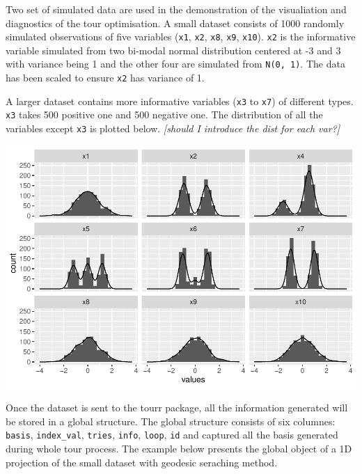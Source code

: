 \documentclass[12pt]{article}
\newenvironment{Shaded}{\begin{snugshade}}{\end{snugshade}}
\newcommand{\DecValTok}[1]{\textcolor[rgb]{0.00,0.00,0.81}{#1}}
\newcommand{\KeywordTok}[1]{\textcolor[rgb]{0.13,0.29,0.53}{\textbf{#1}}}
\newcommand{\NormalTok}[1]{#1}
\newcommand{\OperatorTok}[1]{\textcolor[rgb]{0.81,0.36,0.00}{\textbf{#1}}}
\newcommand{\StringTok}[1]{\textcolor[rgb]{0.31,0.60,0.02}{#1}}
\begin{document}
Two set of simulated data are used in the demonstration of the
visualiation and diagnostics of the tour optimisation. A small dataset
consists of 1000 randomly simulated observations of five variables
(\texttt{x1}, \texttt{x2}, \texttt{x8}, \texttt{x9}, \texttt{x10}).
\texttt{x2} is the informative variable simulated from two bi-modal
normal distribution centered at -3 and 3 with variance being 1 and the
other four are simulated from \texttt{N(0,\ 1)}. The data has been
scaled to ensure \texttt{x2} has variance of 1.

A larger dataset contains more informative variables (\texttt{x3} to
\texttt{x7}) of different types. \texttt{x3} takes 500 positive one and
500 negative one. The distribution of all the variables except
\texttt{x3} is plotted below. \emph{{[}should I introduce the dist for
each var?{]}}

\includegraphics{paper_files/figure-latex/unnamed-chunk-3-1.pdf}

Once the dataset is sent to the tourr package, all the information
generated will be stored in a global structure. The global structure
consists of six columnes: \texttt{basis}, \texttt{index\_val},
\texttt{tries}, \texttt{info}, \texttt{loop}, \texttt{id} and captured
all the basis generated during whole tour process. The example below
presents the global object of a 1D projection of the small dataset with
geodesic seraching method.

\begin{Shaded}
\end{Shaded}
\end{document}
